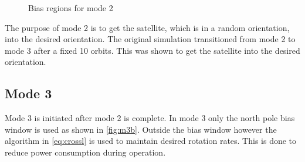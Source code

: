 \begin{figure}[htb!]
    \caption{Bias regions for mode 2}
    \label{fig:m2b}
\end{figure}

The purpose of mode 2 is to get the satellite, which is in a random orientation, into the desired orientation. The original simulation transitioned from mode 2 to mode 3 after a fixed 10 orbits. This was shown to get the satellite into the desired orientation.

\subsection{Mode 3}

Mode 3 is initiated after mode 2 is complete. In mode 3 only the north pole bias window is used as shown in \cref{fig:m3b}. Outside the bias window however the algorithm in \cref{eq:crossl} is used to maintain desired rotation rates. This is done to reduce power consumption during operation.

